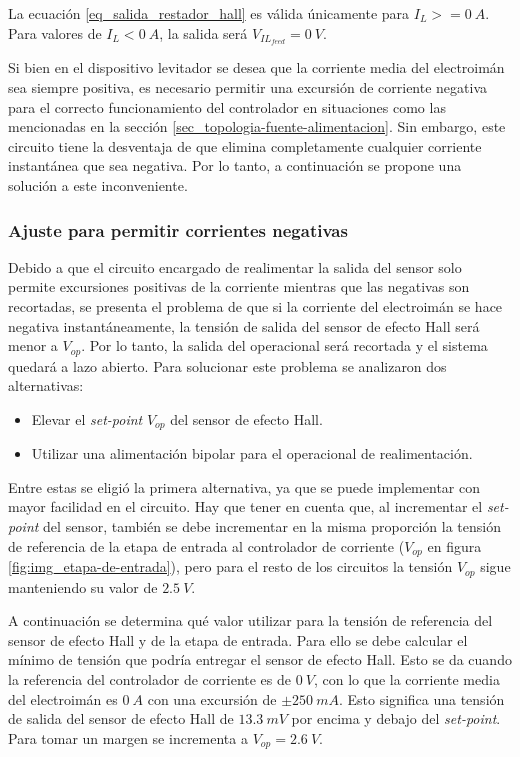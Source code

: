 La ecuación \ref{eq_salida_restador_hall} es válida únicamente para $I_L>=0\:A$. Para valores de $I_L<0\:A$, la salida será $V_{IL_{feed}}=0\:V$.

Si bien en el dispositivo levitador se desea que la corriente media del electroimán sea siempre positiva, es necesario permitir una excursión de corriente negativa para el correcto funcionamiento del controlador en situaciones como las mencionadas en la sección \ref{sec_topologia-fuente-alimentacion}. Sin embargo, este circuito tiene la desventaja de que elimina completamente cualquier corriente instantánea que sea negativa. Por lo tanto, a continuación se propone una solución a este inconveniente.




\subsubsection{Ajuste para permitir corrientes negativas}

Debido a que el circuito encargado de realimentar la salida del sensor solo permite excursiones positivas de la corriente mientras que las negativas son recortadas, se presenta el problema de que si la corriente del electroimán se hace negativa instantáneamente, la tensión de salida del sensor de efecto Hall será menor a $V_{op}$. Por lo tanto, la salida del operacional será recortada y el sistema quedará a lazo abierto. Para solucionar este problema se analizaron dos alternativas:

\begin{itemize} 
	\item Elevar el \textsl{set-point}  $V_{op}$ del sensor de efecto Hall.
	
	\item Utilizar una alimentación bipolar para el operacional de realimentación.
\end{itemize}

Entre estas se eligió la primera alternativa, ya que se puede implementar con mayor facilidad en el circuito. Hay que tener en cuenta que, al incrementar el \textsl{set-point} del sensor, también se debe incrementar en la misma proporción la tensión de referencia de la etapa de entrada al controlador de corriente ($V_{op}$ en figura \ref{fig:img_etapa-de-entrada}), pero para el resto de los circuitos la tensión $V_{op}$ sigue manteniendo su valor de $2.5\:V$.

A continuación se determina qué valor utilizar para la tensión de referencia del sensor de efecto Hall y de la etapa de entrada. Para ello se debe calcular el mínimo de tensión que podría entregar el sensor de efecto Hall. Esto se da cuando la referencia del controlador de corriente es de $0\:V$, con lo que la corriente media del electroimán es $0 \:A$ con una excursión de $±250\:mA$. Esto significa una tensión de salida del sensor de efecto Hall de $13.3\:mV$ por encima y debajo del \textsl{set-point}. Para tomar un margen se incrementa a $V_{op}=2.6\:V$. 

